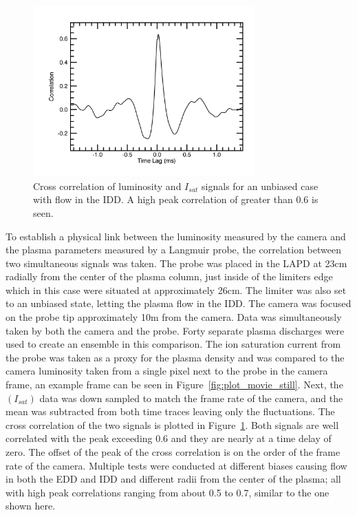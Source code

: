 \documentclass{jpp}
\begin{document}
\begin{figure}
\centerline{\includegraphics[width=8.5cm]{plot_Camera_probe_correlation_23cm_0V}}
\caption{ Cross correlation of luminosity and $I_{sat}$ signals for an unbiased case with flow in the IDD.  A high peak correlation of greater than 0.6 is seen. }
\label{fig:plot_Camera_probe_correlation_23cm_0V}
\end{figure}

To establish a physical link between the luminosity measured by the camera and the plasma parameters measured by a Langmuir probe, the correlation between two simultaneous signals was taken. The probe was placed in the LAPD at 23cm radially from the center of the plasma column, just inside of the limiters edge which in this case were situated at approximately 26cm. The limiter was also set to an unbiased state, letting the plasma flow in the IDD. The camera was focused on the probe tip approximately 10m from the camera. Data was simultaneously taken by both the camera and the probe. Forty separate plasma discharges were used to create an ensemble in this comparison.  The ion saturation current from the probe was taken as a proxy for the plasma density and was compared to the camera luminosity taken from a single pixel next to the probe in the camera frame, an example frame can be seen in Figure~\ref{fig:plot_movie_still}. Next, the $(I_{sat})$ data was down sampled to match the frame rate of the camera, and the mean was subtracted from both time traces leaving only the fluctuations. The cross correlation of the two signals is plotted in Figure~\ref{fig:plot_Camera_probe_correlation_23cm_0V}. Both signals are well correlated with the peak exceeding 0.6 and they are nearly at a time delay of zero. The offset of the peak of the cross correlation is on the order of the frame rate of the camera. Multiple tests were conducted at different biases causing flow in both the EDD and IDD and different radii from the center of the plasma; all with high peak correlations ranging from about 0.5 to 0.7, similar to the one shown here.
\end{document}
